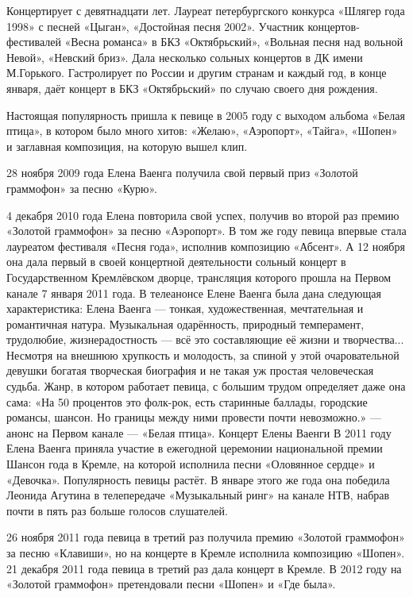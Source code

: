 Концертирует с девятнадцати лет. Лауреат петербургского конкурса «Шлягер года 1998» с песней «Цыган», «Достойная песня 2002». Участник концертов-фестивалей «Весна романса» в БКЗ «Октябрьский», «Вольная песня над вольной Невой», «Невский бриз». Дала несколько сольных концертов в ДК имени М.Горького. Гастролирует по России и другим странам и каждый год, в конце января, даёт концерт в БКЗ «Октябрьский» по случаю своего дня рождения.

Настоящая популярность пришла к певице в 2005 году с выходом альбома «Белая птица», в котором было много хитов: «Желаю», «Аэропорт», «Тайга», «Шопен» и заглавная композиция, на которую вышел клип.

28 ноября 2009 года Елена Ваенга получила свой первый приз «Золотой граммофон» за песню «Курю».

4 декабря 2010 года Елена повторила свой успех, получив во второй раз премию «Золотой граммофон» за песню «Аэропорт». В том же году певица впервые стала лауреатом фестиваля «Песня года», исполнив композицию «Абсент». А 12 ноября она дала первый в своей концертной деятельности сольный концерт в Государственном Кремлёвском дворце, трансляция которого прошла на Первом канале 7 января 2011 года. В телеанонсе Елене Ваенга была дана следующая характеристика:
Елена Ваенга --- тонкая, художественная, мечтательная и романтичная натура. Музыкальная одарённость, природный темперамент, трудолюбие, жизнерадостность --- всё это составляющие её жизни и творчества... Несмотря на внешнюю хрупкость и молодость, за спиной у этой очаровательной девушки богатая творческая биография и не такая уж простая человеческая судьба. Жанр, в котором работает певица, с большим трудом определяет даже она сама: «На 50 процентов это фолк-рок, есть старинные баллады, городские романсы, шансон. Но границы между ними провести почти невозможно.»
--- анонс на Первом канале --- «Белая птица». Концерт Елены Ваенги
В 2011 году Елена Ваенга приняла участие в ежегодной церемонии национальной премии Шансон года в Кремле, на которой исполнила песни «Оловянное сердце» и «Девочка». Популярность певицы растёт. В январе этого же года она победила Леонида Агутина в телепередаче «Музыкальный ринг» на канале НТВ, набрав почти в пять раз больше голосов слушателей.

26 ноября 2011 года певица в третий раз получила премию «Золотой граммофон» за песню «Клавиши», но на концерте в Кремле исполнила композицию «Шопен». 21 декабря 2011 года певица в третий раз дала концерт в Кремле. В 2012 году на «Золотой граммофон» претендовали песни «Шопен» и «Где была».

